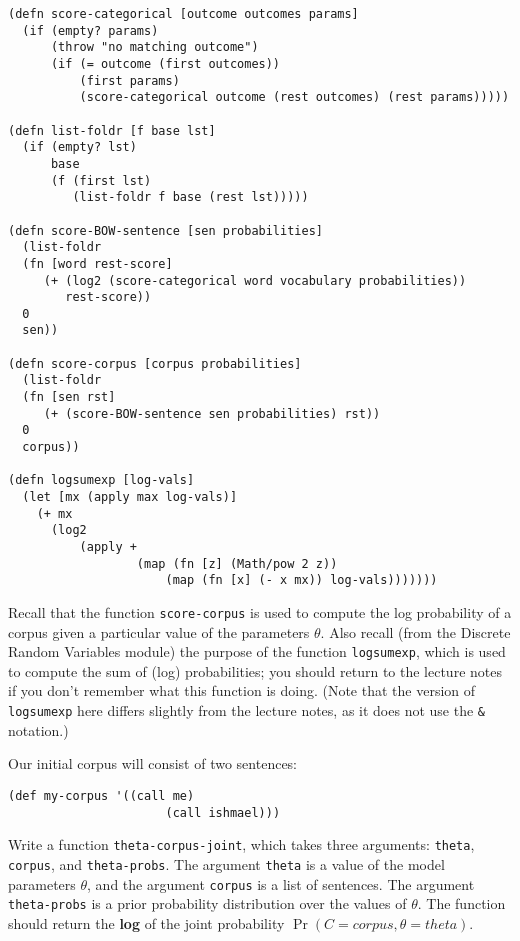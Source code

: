\documentclass[12pt, letterpaper]{article}
\begin{document}
\begin{lstlisting}
(defn score-categorical [outcome outcomes params]
  (if (empty? params)
      (throw "no matching outcome")
      (if (= outcome (first outcomes))
          (first params)
          (score-categorical outcome (rest outcomes) (rest params)))))

(defn list-foldr [f base lst]
  (if (empty? lst)
      base
      (f (first lst)
         (list-foldr f base (rest lst)))))

(defn score-BOW-sentence [sen probabilities]
  (list-foldr 
  (fn [word rest-score] 
     (+ (log2 (score-categorical word vocabulary probabilities))
        rest-score))
  0
  sen))

(defn score-corpus [corpus probabilities]
  (list-foldr
  (fn [sen rst]
     (+ (score-BOW-sentence sen probabilities) rst))
  0
  corpus))

(defn logsumexp [log-vals]
  (let [mx (apply max log-vals)]
    (+ mx
      (log2
          (apply +
                  (map (fn [z] (Math/pow 2 z))
                      (map (fn [x] (- x mx)) log-vals)))))))
\end{lstlisting}

Recall that the function \texttt{score-corpus} is used to compute the
log probability of a corpus given a particular value of the parameters
$\theta$. Also recall (from the Discrete Random Variables module) the
purpose of the function \texttt{logsumexp}, which is used to compute
the sum of (log) probabilities; you should return to the lecture notes
if you don't remember what this function is doing. (Note that the
version of \texttt{logsumexp} here differs slightly from the lecture
notes, as it does not use the \texttt{\&} notation.)

Our initial corpus will consist of two sentences:

\begin{lstlisting}
(def my-corpus '((call me)
                      (call ishmael)))
\end{lstlisting}

Write a function \texttt{theta-corpus-joint}, which takes three
arguments: \texttt{theta}, \texttt{corpus}, and
\texttt{theta-probs}. The argument \texttt{theta} is a value of the
model parameters $\theta$, and the argument \texttt{corpus} is a list
of sentences. The argument \texttt{theta-probs} is a prior probability
distribution over the values of $\theta$. The function should return
the \textbf{log} of the joint probability
$\Pr(C=corpus,\theta=theta)$.
\end{document}
